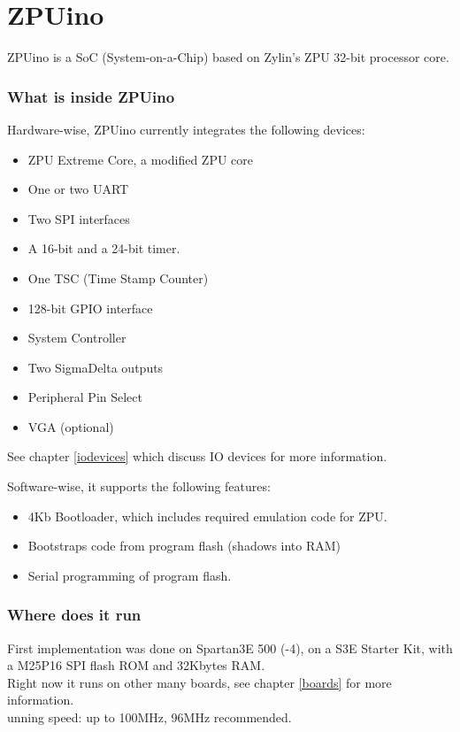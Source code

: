 \chapter{ZPUino}
ZPUino is a SoC (System-on-a-Chip) based on Zylin's ZPU 32-bit processor core.

\subsection{What is inside ZPUino}

Hardware-wise, ZPUino currently integrates the following devices:

\begin{itemize}
\item ZPU Extreme Core, a modified ZPU core
\item One or two UART
\item Two SPI interfaces
\item A 16-bit and a 24-bit timer.
\item One TSC (Time Stamp Counter)
\item 128-bit GPIO interface
\item System Controller
\item Two SigmaDelta outputs
\item Peripheral Pin Select
\item VGA (optional)
\end{itemize}

See chapter \ref{iodevices} which discuss IO devices for more information.

Software-wise, it supports the following features:

\begin{itemize}
\item 4Kb Bootloader, which includes required emulation code for ZPU.
\item Bootstraps code from program flash (shadows into RAM)
\item Serial programming of program flash.
\end{itemize}

\subsection{Where does it run}
First implementation was done on Spartan3E 500 (-4), on a S3E Starter Kit, with a M25P16 SPI flash ROM and 32Kbytes RAM.\\
Right now it runs on other many boards, see chapter \ref{boards} for more information. \\
unning speed: up to 100MHz, 96MHz recommended.


